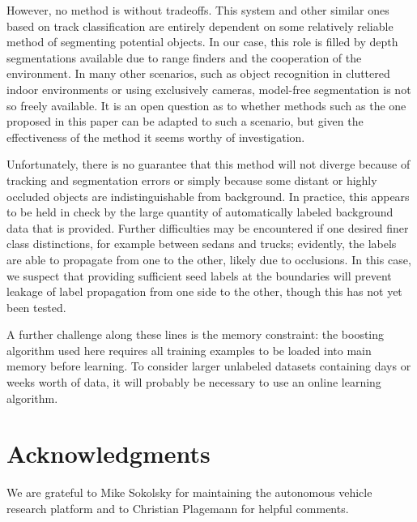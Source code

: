 \documentclass[conference]{IEEEtran}
\begin{document}
However, no method is without tradeoffs.  This system and other similar ones based on track classification are entirely dependent on some relatively reliable method of segmenting potential objects.  In our case, this role is filled by depth segmentations available due to range finders and the cooperation of the environment.  In many other scenarios, such as object recognition in cluttered indoor environments or using exclusively cameras, model-free segmentation is not so freely available.  It is an open question as to whether methods such as the one proposed in this paper can be adapted to such a scenario, but given the effectiveness of the method it seems worthy of investigation.

Unfortunately, there is no guarantee that this method will not diverge because of tracking and segmentation errors or simply because some distant or highly occluded objects are indistinguishable from background.  In practice, this appears to be held in check by the large quantity of automatically labeled background data that is provided.  Further difficulties may be encountered if one desired finer class distinctions, for example between sedans and trucks; evidently, the labels are able to propagate from one to the other, likely due to occlusions.  In this case, we suspect that providing sufficient seed labels at the boundaries will prevent leakage of label propagation from one side to the other, though this has not yet been tested.

A further challenge along these lines is the memory constraint: the boosting algorithm used here requires all training examples to be loaded into main memory before learning.  To consider larger unlabeled datasets containing days or weeks worth of data, it will probably be necessary to use an online learning algorithm.


\section*{Acknowledgments}

We are grateful to Mike Sokolsky for maintaining the autonomous vehicle research platform and to Christian Plagemann for helpful comments.


\small


%
\end{document}
